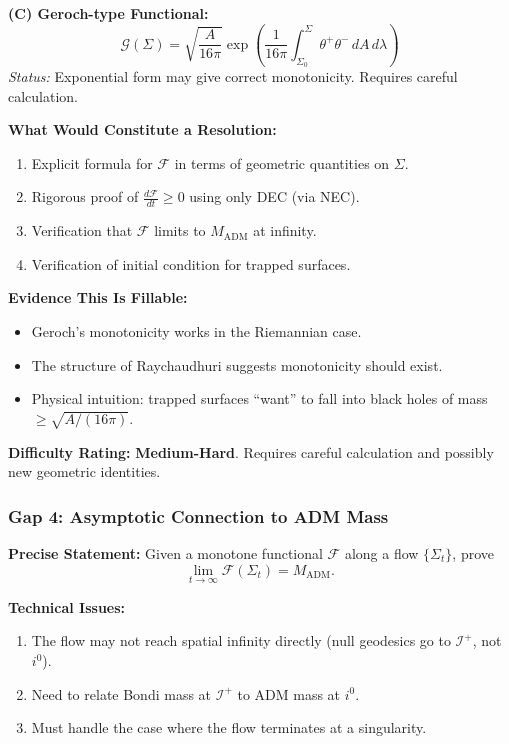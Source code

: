 \textbf{(C) Geroch-type Functional:}
\begin{equation}
    \mathcal{G}(\Sigma) = \sqrt{\frac{A}{16\pi}} \exp\left(\frac{1}{16\pi}\int_{\Sigma_0}^{\Sigma} \theta^+\theta^- \, dA \, d\lambda\right)
\end{equation}
\textit{Status:} Exponential form may give correct monotonicity. Requires careful calculation.

\textbf{What Would Constitute a Resolution:}
\begin{enumerate}
    \item Explicit formula for $\mathcal{F}$ in terms of geometric quantities on $\Sigma$.
    \item Rigorous proof of $\frac{d\mathcal{F}}{dt} \geq 0$ using only DEC (via NEC).
    \item Verification that $\mathcal{F}$ limits to $M_{\mathrm{ADM}}$ at infinity.
    \item Verification of initial condition for trapped surfaces.
\end{enumerate}

\textbf{Evidence This Is Fillable:}
\begin{itemize}
    \item Geroch's monotonicity works in the Riemannian case.
    \item The structure of Raychaudhuri suggests monotonicity should exist.
    \item Physical intuition: trapped surfaces ``want'' to fall into black holes of mass $\geq \sqrt{A/(16\pi)}$.
\end{itemize}

\textbf{Difficulty Rating:} \textbf{Medium-Hard}. Requires careful calculation and possibly new geometric identities.

\subsubsection{Gap 4: Asymptotic Connection to ADM Mass}

\textbf{Precise Statement:} Given a monotone functional $\mathcal{F}$ along a flow $\{\Sigma_t\}$, prove
\begin{equation}
    \lim_{t \to \infty} \mathcal{F}(\Sigma_t) = M_{\mathrm{ADM}}.
\end{equation}

\textbf{Technical Issues:}
\begin{enumerate}
    \item The flow may not reach spatial infinity directly (null geodesics go to $\mathscr{I}^+$, not $i^0$).
    \item Need to relate Bondi mass at $\mathscr{I}^+$ to ADM mass at $i^0$.
    \item Must handle the case where the flow terminates at a singularity.
\end{enumerate}


